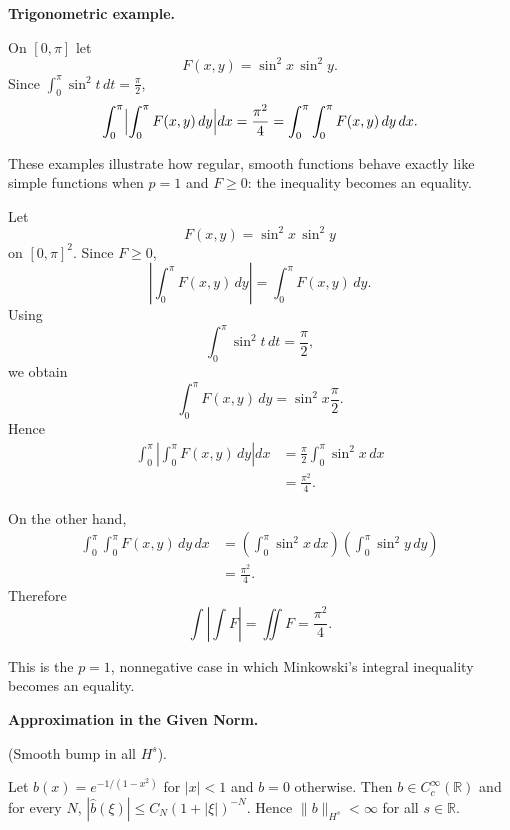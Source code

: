 \begin{problem}[CP-II-0258]
\label{prob:cp-ii-0258}
\textbf{Trigonometric example.}

\hspace*{1.5em}On $[0,\pi]$ let
\[
F(x,y) = \sin^2 x\,\sin^2 y.
\]
Since $\displaystyle \int_0^\pi \sin^2 t\,dt = \frac{\pi}{2}$,
\[
\int_0^\pi \Bigl|\int_0^\pi F(x,y)\,dy\Bigr|dx
= \frac{\pi^2}{4}
= \int_0^\pi\int_0^\pi F(x,y)\,dy\,dx.
\]

These examples illustrate how regular, smooth functions behave exactly
like simple functions when $p=1$ and $F\ge 0$: the inequality becomes an
equality.
\end{problem}

\begin{solution}
Let
\[
F(x,y)=\sin^2x\,\sin^2y
\]
on \([0,\pi]^2\). Since \(F\ge0\),
\[
\left|
\int_0^\pi F(x,y)\,dy
\right|
=
\int_0^\pi F(x,y)\,dy.
\]
Using
\[
\int_0^\pi\sin^2t\,dt=\frac\pi2,
\]
we obtain
\[
\int_0^\pi F(x,y)\,dy
=
\sin^2x\frac\pi2.
\]
Hence
\[
\begin{aligned}
\int_0^\pi
\left|
\int_0^\pi F(x,y)\,dy
\right|dx
&=
\frac\pi2
\int_0^\pi\sin^2x\,dx\\
&=
\frac{\pi^2}{4}.
\end{aligned}
\]

On the other hand,
\[
\begin{aligned}
\int_0^\pi\int_0^\pi F(x,y)\,dy\,dx
&=
\left(
\int_0^\pi\sin^2x\,dx
\right)
\left(
\int_0^\pi\sin^2y\,dy
\right)\\
&=
\frac{\pi^2}{4}.
\end{aligned}
\]
Therefore
\[
\boxed{
\int
\left|\int F\right|
=
\iint F
=
\frac{\pi^2}{4}.
}
\]

This is the \(p=1\), nonnegative case in which Minkowski's integral inequality becomes an
equality.
\end{solution}


\begin{problem}[CP-II-0259]
\label{prob:cp-ii-0259}
\textbf{Approximation in the Given Norm.}

\hspace*{1.5em}(Smooth bump in all $H^s$).

Let $b(x)=e^{-1/(1-x^2)}$ for $|x|<1$ and $b=0$ otherwise.
Then $b\in C_c^\infty(\mathbb R)$ and for every $N$,
$|\widehat b(\xi)|\le C_N(1+|\xi|)^{-N}$. Hence
$\|b\|_{H^s}<\infty$ for all $s\in\mathbb R$.

\clearpage
\end{problem}

